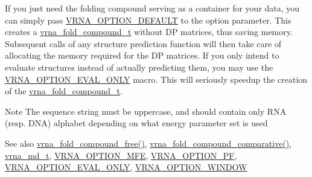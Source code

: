 If you just need the folding compound serving as a container for your data, you can simply pass \hyperlink{group__fold__compound_gacea5b7ee6181c485f36e2afa0e9089e4}{V\+R\+N\+A\+\_\+\+O\+P\+T\+I\+O\+N\+\_\+\+D\+E\+F\+A\+U\+LT} to the {\ttfamily option} parameter. This creates a \hyperlink{group__fold__compound_ga1b0cef17fd40466cef5968eaeeff6166}{vrna\+\_\+fold\+\_\+compound\+\_\+t} without DP matrices, thus saving memory. Subsequent calls of any structure prediction function will then take care of allocating the memory required for the DP matrices. If you only intend to evaluate structures instead of actually predicting them, you may use the \hyperlink{group__fold__compound_ga61469c423131552c8483229f8b6c7e0e}{V\+R\+N\+A\+\_\+\+O\+P\+T\+I\+O\+N\+\_\+\+E\+V\+A\+L\+\_\+\+O\+N\+LY} macro. This will seriously speedup the creation of the \hyperlink{group__fold__compound_ga1b0cef17fd40466cef5968eaeeff6166}{vrna\+\_\+fold\+\_\+compound\+\_\+t}.

\begin{DoxyNote}{Note}
The sequence string must be uppercase, and should contain only R\+NA (resp. D\+NA) alphabet depending on what energy parameter set is used
\end{DoxyNote}
\begin{DoxySeeAlso}{See also}
\hyperlink{group__fold__compound_gadded6039d63f5d6509836e20321534ad}{vrna\+\_\+fold\+\_\+compound\+\_\+free()}, \hyperlink{group__fold__compound_gad6bacc816af274922b13d947f708aa0c}{vrna\+\_\+fold\+\_\+compound\+\_\+comparative()}, \hyperlink{group__model__details_ga1f8a10e12a0a1915f2a4eff0b28ea17c}{vrna\+\_\+md\+\_\+t}, \hyperlink{group__fold__compound_gae63be9127fe7dcc1f9bb14f5bb1064ee}{V\+R\+N\+A\+\_\+\+O\+P\+T\+I\+O\+N\+\_\+\+M\+FE}, \hyperlink{group__fold__compound_gabfbadcddda3e74ce7f49035ef8f058f7}{V\+R\+N\+A\+\_\+\+O\+P\+T\+I\+O\+N\+\_\+\+PF}, \hyperlink{group__fold__compound_ga61469c423131552c8483229f8b6c7e0e}{V\+R\+N\+A\+\_\+\+O\+P\+T\+I\+O\+N\+\_\+\+E\+V\+A\+L\+\_\+\+O\+N\+LY}, \hyperlink{group__fold__compound_ga2b2a8009ccdccc3eb1571556261aee8e}{V\+R\+N\+A\+\_\+\+O\+P\+T\+I\+O\+N\+\_\+\+W\+I\+N\+D\+OW}
\end{DoxySeeAlso}

